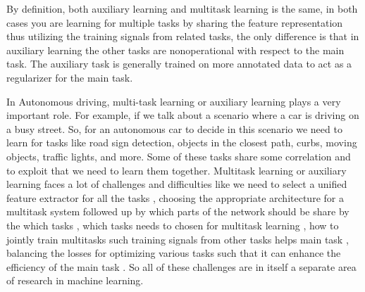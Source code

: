     By definition, both auxiliary learning and multitask learning is the same, in both cases you are learning for multiple tasks by sharing the feature representation thus utilizing the training signals from related tasks, the only difference is that in auxiliary learning the other tasks are nonoperational with respect to the main task. The auxiliary task is generally trained on more annotated data to act as a regularizer for the main task. 
    
    In Autonomous driving, multi-task learning or auxiliary learning plays a very important role. For example, if we talk about a scenario where a car is driving on a busy street. So, for an autonomous car to decide in this scenario we need to learn for tasks like road sign detection, objects in the closest path, curbs, moving objects, traffic lights, and more. Some of these tasks share some correlation and to exploit that we need to learn them together. Multitask learning or auxiliary learning faces a lot of challenges and difficulties like we need to select a unified feature extractor for all the tasks \cite{DBLP:journals/corr/abs-2108-11353}, choosing the appropriate architecture for a multitask system followed up by which parts of the network should be share by the which tasks \cite {Liu_2020_ACCV} \cite{ruder2018latent} \cite{DBLP:journals/corr/abs-1904-02920}, which tasks needs to chosen for multitask learning \cite{DBLP:journals/corr/abs-2110-07301} \cite{DBLP:journals/corr/abs-1904-04153}, how to jointly train multitasks such training signals from other tasks helps main task \cite{DBLP:journals/corr/abs-1903-12117} \cite{DBLP:journals/corr/abs-2007-06889} \cite{DBLP:journals/corr/abs-2001-06782} \cite{Guo_2018_ECCV}, balancing the losses for optimizing various tasks such that it can enhance the efficiency of the main task \cite{DBLP:journals/corr/abs-1904-08492} \cite{pmlr-v80-chen18a} \cite{du2020adapting}. So all of these challenges are in itself a separate area of research in machine learning. 
    
